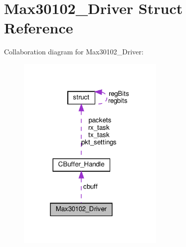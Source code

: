 \hypertarget{structMax30102__Driver}{}\section{Max30102\+\_\+\+Driver Struct Reference}
\label{structMax30102__Driver}


Collaboration diagram for Max30102\+\_\+\+Driver\+:\nopagebreak
\begin{figure}[H]
\begin{center}
\leavevmode
\includegraphics[width=199pt]{structMax30102__Driver__coll__graph}
\end{center}
\end{figure}
